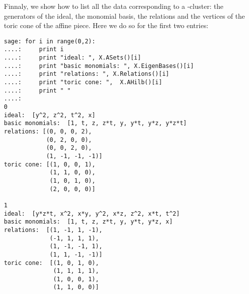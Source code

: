 \vspace{5pt}
\noindent Finnaly, we show how to list all the data corresponding to a  -cluster: the generators of the ideal, the monomial basis, the relations and the vertices of the toric cone of the affine piece. Here we do so for the first two entries:


\vspace{-20pt}
\singlespace
\begin{verbatim}
sage: for i in range(0,2):
....:     print i
....:     print "ideal: ", X.ASets()[i]
....:     print "basic monomials: ", X.EigenBases()[i]
....:     print "relations: ", X.Relations()[i]
....:     print "toric cone: ",  X.AHilb()[i]
....:     print " "
....:     
0
ideal:  [y^2, z^2, t^2, x]
basic monomials:  [1, t, z, z*t, y, y*t, y*z, y*z*t]
relations: [(0, 0, 0, 2),
            (0, 2, 0, 0),
            (0, 0, 2, 0),
            (1, -1, -1, -1)]
toric cone: [(1, 0, 0, 1),
             (1, 1, 0, 0),
             (1, 0, 1, 0),
             (2, 0, 0, 0)]
 
1
ideal:  [y*z*t, x^2, x*y, y^2, x*z, z^2, x*t, t^2]
basic monomials:  [1, t, z, z*t, y, y*t, y*z, x]
relations:  [(1, -1, 1, -1), 
             (-1, 1, 1, 1),
             (1, -1, -1, 1),
             (1, 1, -1, -1)]
toric cone:  [(1, 0, 1, 0), 
              (1, 1, 1, 1),
              (1, 0, 0, 1),
              (1, 1, 0, 0)]
\end{verbatim}

